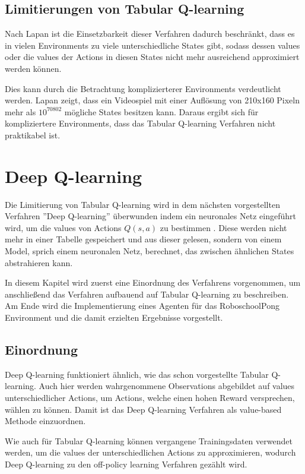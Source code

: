 \documentclass[11pt]{scrartcl}
\begin{document}
\subsection{Limitierungen von Tabular Q-learning}
\label{sec:tabular_q_learning_limits}
Nach Lapan\cite[~S.192]{L2018} ist die Einsetzbarkeit dieser Verfahren dadurch
beschränkt, dass es in vielen Environments zu viele unterschiedliche States gibt, sodass
dessen values oder die values der Actions in diesen States nicht mehr ausreichend
approximiert werden können.

Dies kann durch die Betrachtung komplizierterer Environments verdeutlicht werden. Lapan
\cite[~S.192]{L2018} zeigt, dass ein Videospiel mit einer Auflösung von 210x160 Pixeln
mehr als $10^{70802}$ mögliche States besitzen kann. Daraus ergibt sich für
kompliziertere Environments, dass das Tabular Q-learning Verfahren nicht praktikabel ist.


\section{Deep Q-learning}
\label{sec:dqn}
Die Limitierung von Tabular Q-learning wird in dem nächsten vorgestellten Verfahren
''Deep Q-learning'' überwunden indem ein neuronales Netz eingeführt wird, um die values
von Actions $Q(s, a)$ zu bestimmen \cite[~S.199 ff.]{L2018}. Diese werden nicht mehr in
einer Tabelle gespeichert und aus dieser gelesen, sondern von einem Model, sprich einem
neuronalen Netz, berechnet, das zwischen ähnlichen States abstrahieren kann.

In diesem Kapitel wird zuerst eine Einordnung des Verfahrens vorgenommen, um anschließend
das Verfahren aufbauend auf Tabular Q-learning zu beschreiben. Am Ende wird die
Implementierung eines Agenten für das RoboschoolPong Environment und die damit erzielten
Ergebnisse vorgestellt.

\subsection{Einordnung}
Deep Q-learning funktioniert ähnlich, wie das schon vorgestellte Tabular Q-learning. Auch
hier werden wahrgenommene Observations abgebildet auf values unterschiedlicher Actions, um
Actions, welche einen hohen Reward versprechen, wählen zu können. Damit ist das Deep 
Q-learning Verfahren als value-based Methode einzuordnen.

Wie auch für Tabular Q-learning können vergangene Trainingsdaten verwendet werden, um die
values der unterschiedlichen Actions zu approximieren, wodurch Deep Q-learning zu den
off-policy learning Verfahren gezählt wird.
\end{document}
